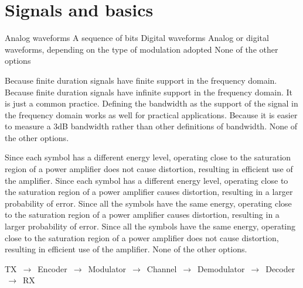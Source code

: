 \section{Signals and basics}

\begin{checkboxes}
    \CorrectChoice Analog waveforms
    \choice A sequence of bits
    \choice Digital waveforms
    \choice Analog or digital waveforms, depending on the type of modulation adopted
    \choice None of the other options
\end{checkboxes}

\begin{checkboxes}
    \choice Because finite duration signals have finite support in the frequency domain.
    \CorrectChoice Because finite duration signals have infinite support in the frequency domain.
    \choice It is just a common practice. Defining the bandwidth as the support of the signal in the frequency domain works as well for practical applications.
    \choice Because it is easier to measure a 3dB bandwidth rather than other definitions of bandwidth.
    \choice None of the other options.
\end{checkboxes}

\begin{checkboxes}
    \choice Since each symbol has a different energy level, operating close to the saturation region of a power amplifier does not cause distortion, resulting in efficient use of the amplifier.
    \choice Since each symbol has a different energy level, operating close to the saturation region of a power amplifier causes distortion, resulting in a larger probability of error.
    \choice Since all the symbols have the same energy, operating close to the saturation region of a power amplifier causes distortion, resulting in a larger probability of error.
    \CorrectChoice Since all the symbols have the same energy, operating close to the saturation region of a power amplifier does not cause distortion, resulting in efficient use of the amplifier.
    \choice None of the other options.
\end{checkboxes}

\begin{solution}
    TX $\,\to\,$ Encoder $\,\to\,$ Modulator  $\,\to\,$ Channel  $\,\to\,$ Demodulator  $\,\to\,$ Decoder  $\,\to\,$ RX
\end{solution}

